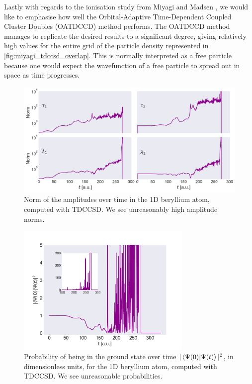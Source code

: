 Lastly with regards to the ionisation study from Miyagi and Madsen \cite{miyagi2013time},
we would like to emphasise how well the Orbital-Adaptive Time-Dependent Coupled Cluster 
Doubles (OATDCCD) method performs. The OATDCCD method manages to replicate the desired results 
to a significant degree, giving relatively high values for the entire grid 
of the particle density represented in \autoref{fig:miyagi_tdccsd_overlap}. This is 
normally interpreted as a free particle because one would expect the wavefunction of 
a free particle to spread out in space as time progresses.

\begin{figure}
    \centering
    \includegraphics[width=\textwidth]{results/figures/miyagi/amplitude_norm_tdccsd.png} 
    \caption{Norm of the amplitudes over time in the 1D beryllium atom, computed 
        with TDCCSD. We see unreasonably high amplitude norms.
    }
    \label{fig:miyagi_tddccsd_amplitude}
\end{figure}

\begin{figure}
    \centering
    \includegraphics[width=0.75\textwidth]{results/figures/miyagi/overlap_tdccsd.png}
    \caption{Probability of being in the ground state over time 
        $|\braket{\Psi(0)}{\Psi(t)}|^2$, in dimensionless units, for the 1D beryllium atom,
        computed with TDCCSD. 
        We see unreasonable probabilities.
    }
    \label{fig:miyagi_tdccsd_overlap}
\end{figure}



\clearemptydoublepage
